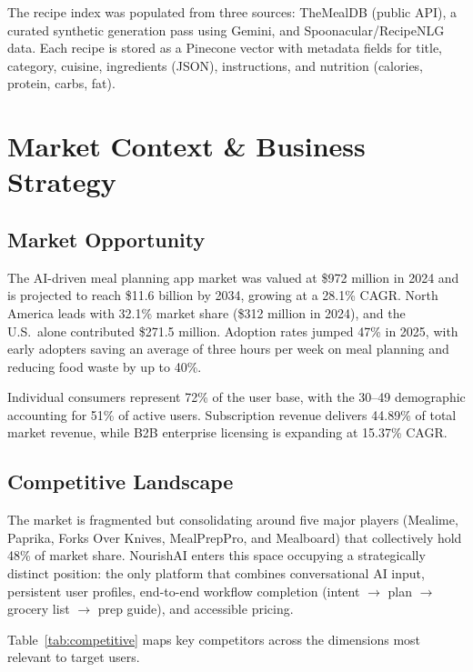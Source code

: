 \documentclass[12pt,letterpaper]{article}
\begin{document}
The recipe index was populated from three sources: TheMealDB (public API), a curated
synthetic generation pass using Gemini, and Spoonacular/RecipeNLG data. Each recipe
is stored as a Pinecone vector with metadata fields for title, category, cuisine, ingredients
(JSON), instructions, and nutrition (calories, protein, carbs, fat).

\section{Market Context \& Business Strategy}
\label{sec:market}

\subsection{Market Opportunity}

The AI-driven meal planning app market was valued at \$972 million in 2024 and is
projected to reach \$11.6 billion by 2034, growing at a 28.1\% CAGR. North America leads
with 32.1\% market share (\$312 million in 2024), and the U.S.\ alone contributed
\$271.5 million. Adoption rates jumped 47\% in 2025, with early adopters saving an average
of three hours per week on meal planning and reducing food waste by up to 40\%.

Individual consumers represent 72\% of the user base, with the 30--49 demographic
accounting for 51\% of active users. Subscription revenue delivers 44.89\% of total market
revenue, while B2B enterprise licensing is expanding at 15.37\% CAGR.

\subsection{Competitive Landscape}

The market is fragmented but consolidating around five major players (Mealime, Paprika,
Forks Over Knives, MealPrepPro, and Mealboard) that collectively hold 48\% of market
share. NourishAI enters this space occupying a strategically distinct position: the only
platform that combines conversational AI input, persistent user profiles, end-to-end workflow
completion (intent $\to$ plan $\to$ grocery list $\to$ prep guide), and accessible pricing.

Table~\ref{tab:competitive} maps key competitors across the dimensions most relevant to
target users.
\end{document}
